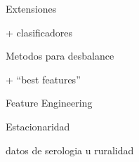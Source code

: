 \documentclass[xcolor=x11names]{beamer}
\begin{document}









	\begin{block}{Extensiones}
		
		\begin{enumerate*}[label={\alph*)},]
			\item + clasificadores 
			\item Metodos para desbalance
			\item + ``best features'' 
			\item Feature Engineering
			\item Estacionaridad
			\item datos de serologia u ruralidad
		\end{enumerate*}

	\end{block}
\end{document}
